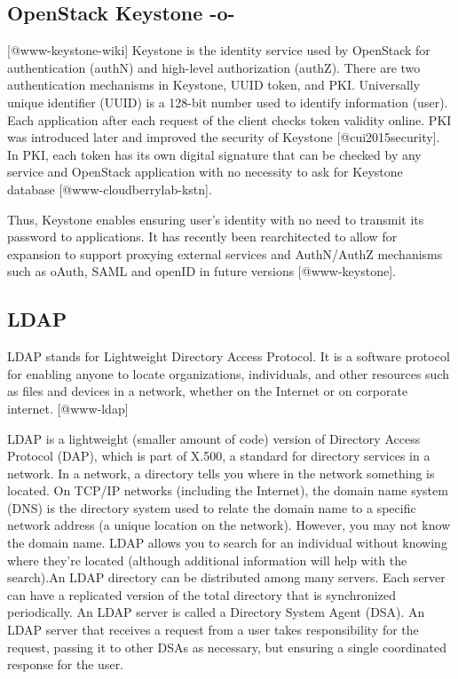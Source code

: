 \subsection{OpenStack Keystone -o-}
 [@www-keystone-wiki] Keystone is the identity service used by
OpenStack for authentication (authN) and high-level authorization
(authZ).  There are two authentication mechanisms in Keystone, UUID
token, and PKI.  Universally unique identifier (UUID) is a 128-bit
number used to identify information (user). Each
application after each request of the client checks token validity
online. PKI was introduced later and improved the security of
Keystone [@cui2015security]. In PKI, each token has its
own digital signature that can be checked by any service and OpenStack
application with no necessity to ask for Keystone
database [@www-cloudberrylab-kstn].
 
Thus, Keystone enables ensuring user's identity with no need to
transmit its password to applications. It has recently been
rearchitected to allow for expansion to support proxying external
services and AuthN/AuthZ mechanisms such as oAuth, SAML and openID in
future versions [@www-keystone].

\subsection{LDAP}

LDAP stands for Lightweight Directory Access Protocol. It is a
software protocol for enabling anyone to locate organizations,
individuals, and other resources such as files and devices in a
network, whether on the Internet or on corporate
internet. [@www-ldap]

LDAP is a lightweight (smaller amount of code) version of Directory
Access Protocol (DAP), which is part of X.500, a standard for
directory services in a network.  In a network, a directory tells you
where in the network something is located. On TCP/IP networks
(including the Internet), the domain name system (DNS) is the
directory system used to relate the domain name to a specific network
address (a unique location on the network). However, you may not know
the domain name. LDAP allows you to search for an individual without
knowing where they're located (although additional information will
help with the search).An LDAP directory can be distributed among many
servers. Each server can have a replicated version of the total
directory that is synchronized periodically.  An LDAP server is called
a Directory System Agent (DSA). An LDAP server that receives a request
from a user takes responsibility for the request, passing it to other
DSAs as necessary, but ensuring a single coordinated response for the
user.

